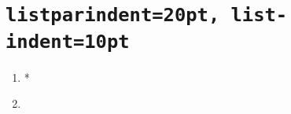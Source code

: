 \documentclass{article}
\begin{document}
\section{\texttt{listparindent=20pt, list-indent=10pt}}
\begin{enumerate}[itemindent=\parindent, listparindent=\parindent, labelsep=0.5em]%
\item* {}\kant[1-2]

\item \kant[3-4]
\end{enumerate}
\end{document}
